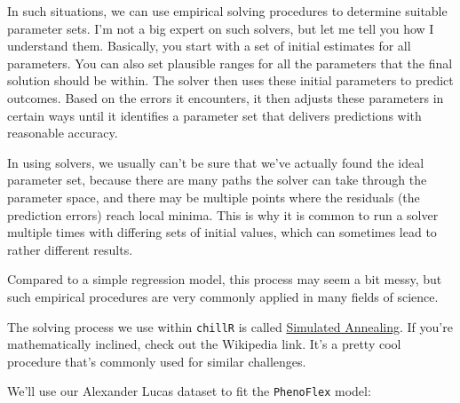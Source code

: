 \documentclass[
]{book}
\newenvironment{Shaded}{\begin{snugshade}}{\end{snugshade}}
\newcommand{\DataTypeTok}[1]{\textcolor[rgb]{0.13,0.29,0.53}{#1}}
\newcommand{\DecValTok}[1]{\textcolor[rgb]{0.00,0.00,0.81}{#1}}
\newcommand{\FloatTok}[1]{\textcolor[rgb]{0.00,0.00,0.81}{#1}}
\newcommand{\KeywordTok}[1]{\textcolor[rgb]{0.13,0.29,0.53}{\textbf{#1}}}
\newcommand{\NormalTok}[1]{#1}
\newcommand{\OperatorTok}[1]{\textcolor[rgb]{0.81,0.36,0.00}{\textbf{#1}}}
\newcommand{\StringTok}[1]{\textcolor[rgb]{0.31,0.60,0.02}{#1}}
\begin{document}
In such situations, we can use empirical solving procedures to determine suitable parameter sets. I'm not a big expert on such solvers, but let me tell you how I understand them. Basically, you start with a set of initial estimates for all parameters. You can also set plausible ranges for all the parameters that the final solution should be within. The solver then uses these initial parameters to predict outcomes. Based on the errors it encounters, it then adjusts these parameters in certain ways until it identifies a parameter set that delivers predictions with reasonable accuracy.

In using solvers, we usually can't be sure that we've actually found the ideal parameter set, because there are many paths the solver can take through the parameter space, and there may be multiple points where the residuals (the prediction errors) reach local minima. This is why it is common to run a solver multiple times with differing sets of initial values, which can sometimes lead to rather different results.

Compared to a simple regression model, this process may seem a bit messy, but such empirical procedures are very commonly applied in many fields of science.

The solving process we use within \texttt{chillR} is called \href{https://en.wikipedia.org/wiki/Simulated_annealing}{Simulated Annealing}. If you're mathematically inclined, check out the Wikipedia link. It's a pretty cool procedure that's commonly used for similar challenges.

We'll use our Alexander Lucas dataset to fit the \texttt{PhenoFlex} model:

\begin{Shaded}
\end{Shaded}
\end{document}

